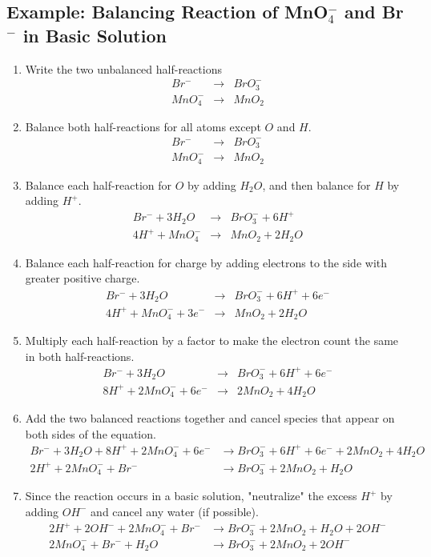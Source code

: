 \documentclass[10pt]{article}
\begin{document}
\subsection*{Example: Balancing Reaction of MnO$_4^-$ and Br$^-$ in Basic Solution}
\begin{enumerate}
    \item Write the two unbalanced half-reactions
    \begin{eqnarray*}
        Br^- &\rightarrow& BrO_3^- \\
        MnO_4^- &\rightarrow& MnO_2 
    \end{eqnarray*}
    \item Balance both half-reactions for all atoms except $O$ and $H$.
    \begin{eqnarray*}
        Br^- &\rightarrow& BrO_3^- \\
        MnO_4^- &\rightarrow& MnO_2 
    \end{eqnarray*}
    \item Balance each half-reaction for $O$ by adding $H_2 O$, and then balance for $H$ by adding $H^+$.
    \begin{eqnarray*}
        Br^- + 3 H_2O&\rightarrow& BrO_3^- + 6 H^+\\
        4 H^+ + MnO_4^- &\rightarrow& MnO_2 + 2H_2O
    \end{eqnarray*}
    \item Balance each half-reaction for charge by adding electrons to the side with greater positive charge.
    \begin{eqnarray*}
        Br^- + 3 H_2O&\rightarrow& BrO_3^- + 6 H^+ + 6e^-\\
        4 H^+ + MnO_4^- + 3e^- &\rightarrow& MnO_2 + 2H_2O
    \end{eqnarray*}
    \item Multiply each half-reaction by a factor to make the electron count the same in both half-reactions.
    \begin{eqnarray*}
        Br^- + 3 H_2O&\rightarrow& BrO_3^- + 6 H^+ + 6e^-\\
        8 H^+ + 2MnO_4^- + 6e^- &\rightarrow& 2MnO_2 + 4H_2O
    \end{eqnarray*}
    \item Add the two balanced reactions together and cancel species that appear on both sides of the equation.
    \begin{align*}
        Br^- + 3 H_2O + 8 H^+ + 2MnO_4^- + 6e^-&\rightarrow BrO_3^- + 6 H^+ + 6e^- + 2MnO_2 + 4H_2O\\
        2 H^+ + 2MnO_4^- + Br^- &\rightarrow BrO_3^- + 2MnO_2 + H_2O
    \end{align*}
    \item Since the reaction occurs in a basic solution, "neutralize" the excess $H^+$ by adding $OH^-$ and cancel any water (if possible).
    \begin{align*}
        2 H^+ + 2 OH^- + 2MnO_4^- + Br^- &\rightarrow BrO_3^- + 2MnO_2 + H_2O + 2 OH^- \\
        2MnO_4^- + Br^- + H_2O &\rightarrow BrO_3^- + 2MnO_2 + 2 OH^- \\
    \end{align*}
\end{enumerate} 
\end{document}
